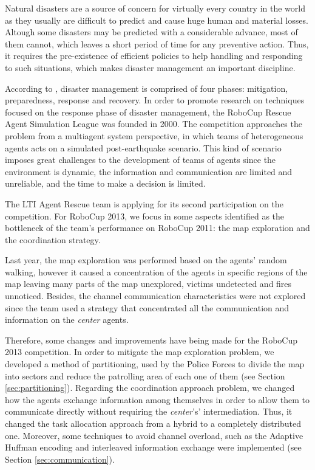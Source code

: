 Natural disasters are a source of concern for virtually every country in the world as they usually are difficult to predict and cause huge human and material losses. Altough some disasters may be predicted with a considerable advance, most of them cannot, which leaves a short period of time for any preventive action. Thus, it requires the pre-existence of efficient policies to help handling and responding to such situations, which makes disaster management an important discipline. 

According to \cite{blanchardEtAl2007}, disaster management is comprised of four phases: mitigation, preparedness, response and recovery. In order to promote research on techniques focused on the response phase of disaster management, the RoboCup Rescue Agent Simulation League \cite{kitanoEtAl1999} was founded in 2000. The competition approaches the problem from a multiagent system perspective, in which teams of heterogeneous agents acts on a simulated post-earthquake scenario. This kind of scenario imposes great challenges to the development of teams of agents since the environment is dynamic, the information and communication are limited and unreliable, and the time to make a decision is limited.

The LTI Agent Rescue team is applying for its second participation on the competition. For RoboCup 2013, we focus in some aspects identified as the bottleneck of the team's performance on RoboCup 2011: the map exploration and the coordination strategy.

Last year, the map exploration was performed based on the agents' random walking, however it caused a concentration of the agents in specific regions of the map leaving many parts of the map unexplored, victims undetected and fires unnoticed. Besides, the channel communication characteristics were not explored since the team used a strategy that concentrated all the communication and information on the {\it center} agents.

Therefore, some changes and improvements have being made for the RoboCup 2013 competition. In order to mitigate the map exploration problem, we developed a method of partitioning, used by the Police Forces to divide the map into sectors and reduce the patrolling area of each one of them (see Section \ref{sec:partitioning}). Regarding the coordination approach problem, we changed how the agents exchange information among themselves in order to allow them to communicate directly without requiring the {\it center}'s' intermediation. Thus, it changed the task allocation approach from a hybrid to a completely distributed one. Moreover, some techniques to avoid channel overload, such as the Adaptive Huffman encoding \cite{huffman1952,vitter1987} and interleaved information exchange were implemented (see Section \ref{sec:communication}).

